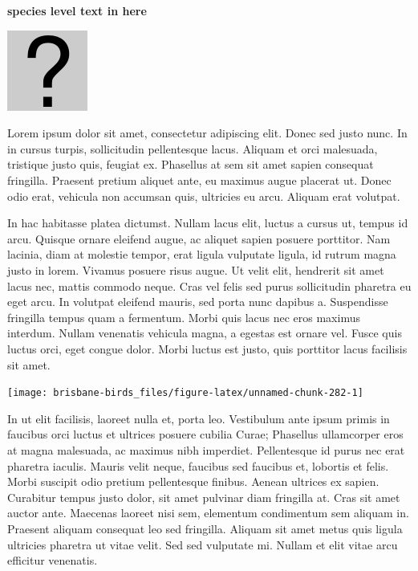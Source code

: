 \documentclass[]{book}
\let\origfigure\figure
\let\endorigfigure\endfigure
\renewenvironment{figure}[1][2] {
  \expandafter\origfigure\expandafter[H]
} {
  \endorigfigure
}
\begin{document}
\textbf{species level text in here}

\begin{figure}
\centering
\includegraphics{assets/missing.png}
\caption{No image for species}
\end{figure}

Lorem ipsum dolor sit amet, consectetur adipiscing elit. Donec sed justo
nunc. In in cursus turpis, sollicitudin pellentesque lacus. Aliquam et
orci malesuada, tristique justo quis, feugiat ex. Phasellus at sem sit
amet sapien consequat fringilla. Praesent pretium aliquet ante, eu
maximus augue placerat ut. Donec odio erat, vehicula non accumsan quis,
ultricies eu arcu. Aliquam erat volutpat.

In hac habitasse platea dictumst. Nullam lacus elit, luctus a cursus ut,
tempus id arcu. Quisque ornare eleifend augue, ac aliquet sapien posuere
porttitor. Nam lacinia, diam at molestie tempor, erat ligula vulputate
ligula, id rutrum magna justo in lorem. Vivamus posuere risus augue. Ut
velit elit, hendrerit sit amet lacus nec, mattis commodo neque. Cras vel
felis sed purus sollicitudin pharetra eu eget arcu. In volutpat eleifend
mauris, sed porta nunc dapibus a. Suspendisse fringilla tempus quam a
fermentum. Morbi quis lacus nec eros maximus interdum. Nullam venenatis
vehicula magna, a egestas est ornare vel. Fusce quis luctus orci, eget
congue dolor. Morbi luctus est justo, quis porttitor lacus facilisis sit
amet.

\begin{figure}
\texttt{[image: brisbane-birds\_files/figure-latex/unnamed-chunk-282-1]} \caption{insert figure caption}\label{fig:unnamed-chunk-282}
\end{figure}

In ut elit facilisis, laoreet nulla et, porta leo. Vestibulum ante ipsum
primis in faucibus orci luctus et ultrices posuere cubilia Curae;
Phasellus ullamcorper eros at magna malesuada, ac maximus nibh
imperdiet. Pellentesque id purus nec erat pharetra iaculis. Mauris velit
neque, faucibus sed faucibus et, lobortis et felis. Morbi suscipit odio
pretium pellentesque finibus. Aenean ultrices ex sapien. Curabitur
tempus justo dolor, sit amet pulvinar diam fringilla at. Cras sit amet
auctor ante. Maecenas laoreet nisi sem, elementum condimentum sem
aliquam in. Praesent aliquam consequat leo sed fringilla. Aliquam sit
amet metus quis ligula ultricies pharetra ut vitae velit. Sed sed
vulputate mi. Nullam et elit vitae arcu efficitur venenatis.
\end{document}
